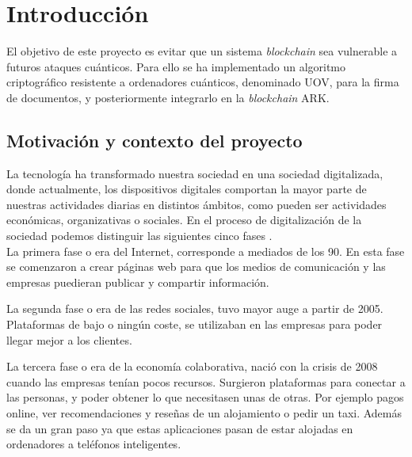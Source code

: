\chapter{Introducción}

El objetivo de este proyecto es evitar que un sistema \textit{blockchain} sea vulnerable a futuros ataques cuánticos. Para ello se ha implementado un algoritmo criptográfico resistente a ordenadores cuánticos, denominado UOV, para la firma de documentos, y posteriormente integrarlo en la \textit{blockchain} ARK.

\section{Motivación y contexto del proyecto}
\label{sec:intro:motivacion} %


La tecnología ha transformado nuestra sociedad en una sociedad digitalizada, donde actualmente, los dispositivos digitales comportan la mayor parte de nuestras actividades diarias en distintos ámbitos, como pueden ser actividades económicas, organizativas o sociales. En el proceso de digitalización de la sociedad podemos distinguir las siguientes cinco fases \cite{fases-digitalizacion}.\\

La primera fase o era del Internet, corresponde a mediados de los 90. En esta fase se comenzaron a crear páginas web para que los medios de comunicación y las empresas puedieran publicar y compartir información.

La segunda fase o era de las redes sociales, tuvo mayor auge a partir de 2005. Plataformas de bajo o ningún coste, se utilizaban en las empresas para poder llegar mejor a los clientes.

La tercera fase o era de la economía colaborativa, nació con la crisis de  2008 cuando las empresas tenían pocos recursos. Surgieron plataformas para conectar a las personas, y poder obtener lo que necesitasen unas de otras. Por ejemplo pagos online, ver recomendaciones y reseñas de un alojamiento o pedir un taxi. Además se da un gran paso ya que estas aplicaciones pasan de estar  alojadas en ordenadores a teléfonos inteligentes.

